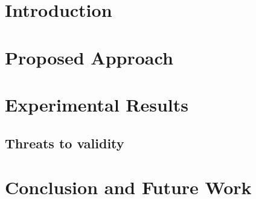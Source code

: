 	
	\author{
	}
	
	\maketitle	

	\begin{abstract}
		\label{sec:abstract}
		
	\end{abstract}


\section{Introduction}
\label{sec:introduction}


\section{Proposed Approach}
\label{sec:framework}


\section{Experimental Results}
\label{sec:exp_results}


\subsection{Threats to validity}
\label{sec:threats}



%

\section{Conclusion and Future Work}
\label{sec:conclusion}


%

%

\balance

\let\oldthebibliography=\thebibliography
\let\endoldthebibliography=\endthebibliography
{\scriptsize
	
	
}

